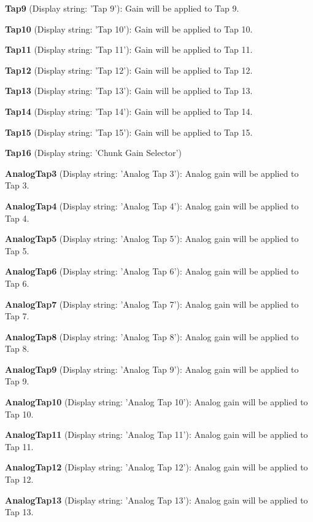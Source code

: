 \begin{DoxyItemize}
\item {\bfseries Tap9} (Display string\+: 'Tap 9')\+: Gain will be applied to Tap 9.
\item {\bfseries Tap10} (Display string\+: 'Tap 10')\+: Gain will be applied to Tap 10.
\item {\bfseries Tap11} (Display string\+: 'Tap 11')\+: Gain will be applied to Tap 11.
\item {\bfseries Tap12} (Display string\+: 'Tap 12')\+: Gain will be applied to Tap 12.
\item {\bfseries Tap13} (Display string\+: 'Tap 13')\+: Gain will be applied to Tap 13.
\item {\bfseries Tap14} (Display string\+: 'Tap 14')\+: Gain will be applied to Tap 14.
\item {\bfseries Tap15} (Display string\+: 'Tap 15')\+: Gain will be applied to Tap 15.
\item {\bfseries Tap16} (Display string\+: 'Chunk Gain Selector')
\item {\bfseries Analog\+Tap3} (Display string\+: 'Analog Tap 3')\+: Analog gain will be applied to Tap 3.
\item {\bfseries Analog\+Tap4} (Display string\+: 'Analog Tap 4')\+: Analog gain will be applied to Tap 4.
\item {\bfseries Analog\+Tap5} (Display string\+: 'Analog Tap 5')\+: Analog gain will be applied to Tap 5.
\item {\bfseries Analog\+Tap6} (Display string\+: 'Analog Tap 6')\+: Analog gain will be applied to Tap 6.
\item {\bfseries Analog\+Tap7} (Display string\+: 'Analog Tap 7')\+: Analog gain will be applied to Tap 7.
\item {\bfseries Analog\+Tap8} (Display string\+: 'Analog Tap 8')\+: Analog gain will be applied to Tap 8.
\item {\bfseries Analog\+Tap9} (Display string\+: 'Analog Tap 9')\+: Analog gain will be applied to Tap 9.
\item {\bfseries Analog\+Tap10} (Display string\+: 'Analog Tap 10')\+: Analog gain will be applied to Tap 10.
\item {\bfseries Analog\+Tap11} (Display string\+: 'Analog Tap 11')\+: Analog gain will be applied to Tap 11.
\item {\bfseries Analog\+Tap12} (Display string\+: 'Analog Tap 12')\+: Analog gain will be applied to Tap 12.
\item {\bfseries Analog\+Tap13} (Display string\+: 'Analog Tap 13')\+: Analog gain will be applied to Tap 13.

\end{DoxyItemize}
